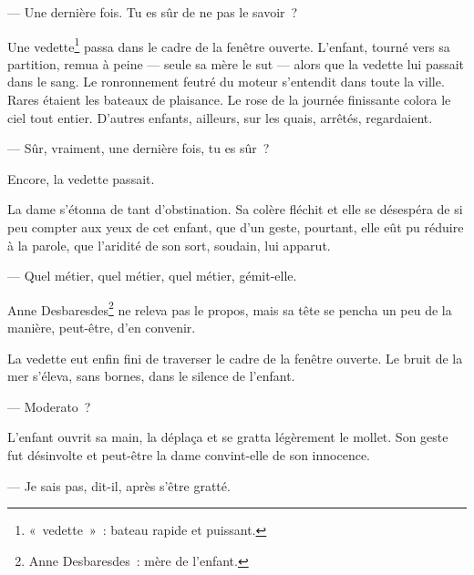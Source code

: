 {

--- Une dernière fois. Tu es sûr de ne pas le savoir~?

Une vedette\footnote{«~vedette~»~: bateau rapide et puissant.} passa dans le cadre de la fenêtre ouverte. L'enfant, tourné vers sa partition, remua à peine — seule sa mère le sut — alors que la vedette lui passait dans le sang. Le ronronnement feutré du moteur s'entendit dans toute la ville. Rares étaient les bateaux de plaisance. Le rose de la journée finissante colora le ciel tout entier. D'autres enfants, ailleurs, sur les quais, arrêtés, regardaient.

--- Sûr, vraiment, une dernière fois, tu es sûr~?

Encore, la vedette passait.

La dame s'étonna de tant d'obstination. Sa colère fléchit et elle se désespéra de si peu compter aux yeux de cet enfant, que d'un geste, pourtant, elle eût pu réduire à la parole, que l'aridité de son sort, soudain, lui apparut.

--- Quel métier, quel métier, quel métier, gémit-elle.

Anne Desbaresdes\footnote{Anne Desbaresdes~: mère de l'enfant.} ne releva pas le propos, mais sa tête se pencha un peu de la manière, peut-être, d'en convenir.

La vedette eut enfin fini de traverser le cadre de la fenêtre ouverte. Le bruit de la mer s'éleva, sans bornes, dans le silence de l'enfant.

--- Moderato~?

L'enfant ouvrit sa main, la déplaça et se gratta légèrement le mollet. Son geste fut désinvolte et peut-être la dame convint-elle de son innocence.

--- Je sais pas, dit-il, après s'être gratté.

}
